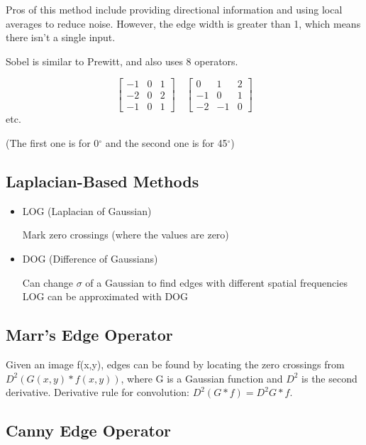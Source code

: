 \documentclass{article}
\begin{document}
\begin{multicols}{2}
Pros of this method include providing directional information and using local averages to reduce noise. However, the edge width is greater than 1, which means there isn't a single input.

Sobel is similar to Prewitt, and also uses 8 operators.

        \[
          \begin{bmatrix}
            -1 & 0 & 1\\
            -2 & 0 & 2\\
            -1 & 0 & 1
          \end{bmatrix}\quad
          \begin{bmatrix}
            0 & 1 & 2\\
            -1 & 0 & 1\\
            -2 & -1 & 0
          \end{bmatrix}
        \]
etc.

(The first one is for 0$^{\circ}$ and the second one is for 45$^{\circ}$)

\subsection{Laplacian-Based Methods}

\begin{itemize}
  \item {LOG (Laplacian of Gaussian)}
  
  Mark zero crossings (where the values are zero)
  \item {DOG (Difference of Gaussians)}
  
  Can change $\sigma$ of a Gaussian to find edges with different spatial frequencies
  LOG can be approximated with DOG
\end{itemize}

\subsection{Marr's Edge Operator}

Given an image f(x,y), edges can be found by locating the zero crossings from \(D^2(G(x,y)*f(x,y))\), where G is a Gaussian function and $D^2$ is the second derivative.
Derivative rule for convolution: \(D^2(G*f) = D^2G * f\).

\subsection{Canny Edge Operator}


\end{multicols}
\end{document}
